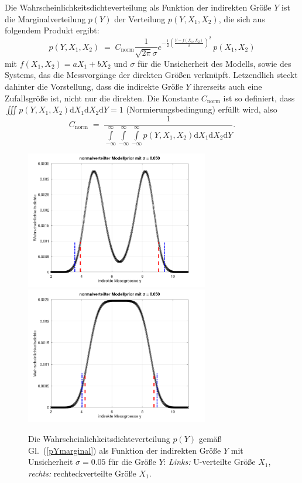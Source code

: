 Die Wahrscheinlichkeitsdichteverteilung als Funktion der indirekten Größe $Y$ ist
die Marginalverteilung $p(Y)$ der Verteilung $p(Y,X_1,X_2)$, die sich aus folgendem Produkt ergibt:
\begin{equation}
p(Y,X_1,X_2) \; = \; C_\mathrm{norm}
\frac{1}{\sqrt{2\pi} \sigma} e^{-\frac{1}{2}\left(\frac{Y - f(X_1, X_2)}{\sigma}\right)^2}
\, p(X_1,X_2)
\end{equation}
mit $f(X_1, X_2) = a X_1 + b X_2$ und $\sigma$ für die Unsicherheit des Modells, sowie des
Systems, das die Messvorgänge der direkten Größen verknüpft. Letzendlich steckt dahinter
die Vorstellung, dass die indirekte Größe $Y$ ihrerseits auch eine Zufallsgröße ist, nicht nur
die direkten. Die Konstante $C_\mathrm{norm}$ ist so definiert, dass
$\iiint p(Y,X_1,X_2) \mathrm{d}X_1 \mathrm{d}X_2 \mathrm{d}Y = 1$ (Normierungsbedingung) erfüllt wird, also
\begin{equation}
C_\mathrm{norm} \; = \; \frac{1}{\int\limits_{-\infty}^{\infty} \int\limits_{-\infty}^{\infty}
	\int\limits_{-\infty}^{\infty} p(Y,X_1,X_2) \mathrm{d}X_1 \mathrm{d}X_2 \mathrm{d}Y } .
\end{equation}

\begin{figure}
	\begin{center}
	\includegraphics[width=80mm]{11_vorlesung_GUMS1/media/indirekte_y_modellGauss_sigma0p050.png}
		\hspace{2mm}
	\includegraphics[width=80mm]{11_vorlesung_GUMS1/media/indirekte_y_modellGauss_sigma0p050_box.png}
		\caption{Die Wahrscheinlichkeitsdichteverteilung $p(Y)$ gemäß Gl.~(\ref{pYmarginal}) als Funktion der
			indirekten Größe $Y$ mit Unsicherheit $\sigma = 0.05$ für die Größe $Y$:
			\textsl{Links:} U-verteilte Größe $X_1$,
			\textsl{rechts:} rechteckverteilte Größe $X_1$.}
		\label{pdfYsigma}
	\end{center}
\end{figure}

